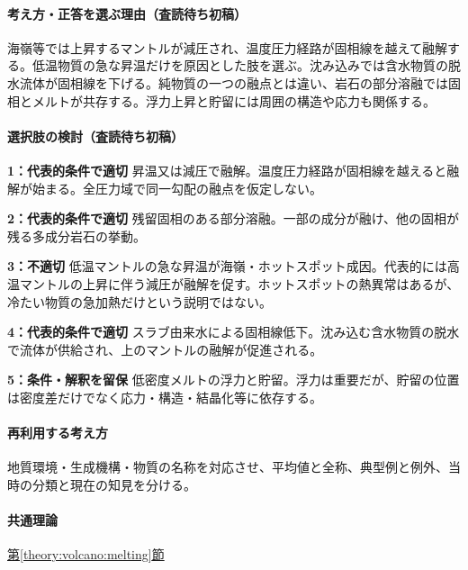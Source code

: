 \paragraph{考え方・正答を選ぶ理由（査読待ち初稿）} 海嶺等では上昇するマントルが減圧され、温度圧力経路が固相線を越えて融解する。低温物質の急な昇温だけを原因とした肢を選ぶ。沈み込みでは含水物質の脱水流体が固相線を下げる。純物質の一つの融点とは違い、岩石の部分溶融では固相とメルトが共存する。浮力上昇と貯留には周囲の構造や応力も関係する。

\paragraph{選択肢の検討（査読待ち初稿）}\mbox{}\par

\noindent\textbf{1：代表的条件で適切} 昇温又は減圧で融解。温度圧力経路が固相線を越えると融解が始まる。全圧力域で同一勾配の融点を仮定しない。\par

\noindent\textbf{2：代表的条件で適切} 残留固相のある部分溶融。一部の成分が融け、他の固相が残る多成分岩石の挙動。\par

\noindent\textbf{3：不適切} 低温マントルの急な昇温が海嶺・ホットスポット成因。代表的には高温マントルの上昇に伴う減圧が融解を促す。ホットスポットの熱異常はあるが、冷たい物質の急加熱だけという説明ではない。\par

\noindent\textbf{4：代表的条件で適切} スラブ由来水による固相線低下。沈み込む含水物質の脱水で流体が供給され、上のマントルの融解が促進される。\par

\noindent\textbf{5：条件・解釈を留保} 低密度メルトの浮力と貯留。浮力は重要だが、貯留の位置は密度差だけでなく応力・構造・結晶化等に依存する。\par

\paragraph{再利用する考え方} 地質環境・生成機構・物質の名称を対応させ、平均値と全称、典型例と例外、当時の分類と現在の知見を分ける。

\paragraph{共通理論} \hyperref[theory:volcano:melting]{第\ref*{theory:volcano:melting}節}

